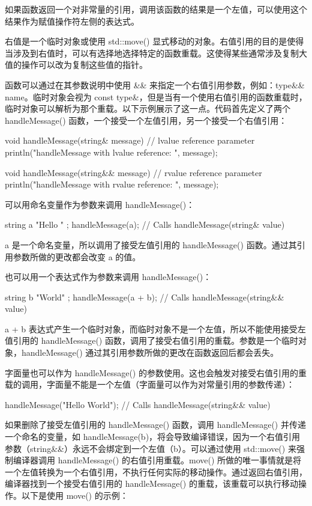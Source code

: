 如果函数返回一个对非常量的引用，调用该函数的结果是一个左值，可以使用这个结果作为赋值操作符左侧的表达式。

右值是一个临时对象或使用 std::move() 显式移动的对象。右值引用的目的是使得当涉及到右值时，可以有选择地选择特定的函数重载。这使得某些通常涉及复制大值的操作可以改为复制这些值的指针。

函数可以通过在其参数说明中使用 \&\& 来指定一个右值引用参数，例如：type\&\& name。临时对象会视为 const type\&，但是当有一个使用右值引用的函数重载时，临时对象可以解析为那个重载。以下示例展示了这一点。代码首先定义了两个 handleMessage() 函数，一个接受一个左值引用，另一个接受一个右值引用：

\begin{cpp}
void handleMessage(string& message) // lvalue reference parameter
{
    println("handleMessage with lvalue reference: {}", message);
}

void handleMessage(string&& message) // rvalue reference parameter
{
    println("handleMessage with rvalue reference: {}", message);
}
\end{cpp}

可以用命名变量作为参数来调用 handleMessage()：

\begin{cpp}
string a { "Hello " };
handleMessage(a); // Calls handleMessage(string& value)
\end{cpp}

a 是一个命名变量，所以调用了接受左值引用的 handleMessage() 函数。通过其引用参数所做的更改都会改变 a 的值。

也可以用一个表达式作为参数来调用 handleMessage()：

\begin{cpp}
string b { "World" };
handleMessage(a + b); // Calls handleMessage(string&& value)
\end{cpp}

a + b 表达式产生一个临时对象，而临时对象不是一个左值，所以不能使用接受左值引用的 handleMessage() 函数，调用了接受右值引用的重载。参数是一个临时对象，handleMessage() 通过其引用参数所做的更改在函数返回后都会丢失。

字面量也可以作为 handleMessage() 的参数使用。这也会触发对接受右值引用的重载的调用，字面量不能是一个左值（字面量可以作为对常量引用的参数传递）：

\begin{cpp}
handleMessage("Hello World"); // Calls handleMessage(string&& value)
\end{cpp}

如果删除了接受左值引用的 handleMessage() 函数，调用 handleMessage() 并传递一个命名的变量，如 handleMessage(b)，将会导致编译错误，因为一个右值引用参数（string\&\&）永远不会绑定到一个左值（b）。可以通过使用 std::move() 来强制编译器调用 handleMessage() 的右值引用重载。move() 所做的唯一事情就是将一个左值转换为一个右值引用，不执行任何实际的移动操作。通过返回右值引用，编译器找到一个接受右值引用的 handleMessage() 的重载，该重载可以执行移动操作。以下是使用 move() 的示例：

